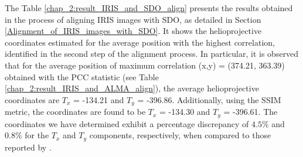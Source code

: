 \documentclass[a4paper,alpha-refs]{eSpectra}
\begin{document}




The Table \ref{chap_2:result_IRIS_and_SDO_align} presents the results obtained in the process of aligning IRIS images with SDO, as detailed in Section \ref{Alignment_of_IRIS_images_with_SDO}. It shows the helioprojective coordinates estimated for the average position with the highest correlation, identified in the second step of the alignment process. 
In particular, it is observed that for the average position of maximum correlation (x,y) = (374.21, 363.39) obtained with the PCC statistic (see Table \ref{chap_2:result_IRIS_and_ALMA_align}), the average helioprojective coordinates are $T_x$ = -134.21 and $T_y$ = -396.86. Additionally, using the SSIM metric, the coordinates are found to be $T_x$ = -134.30 and $T_y$ = -396.61. The coordinates we have determined exhibit a percentage discrepancy of $4.5\%$ and $0.8\%$ for the $T_x$ and $T_y$ components, respectively, when compared to those reported by \cite{SALSA_guia}. 



\end{document}
